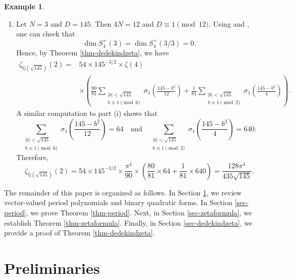 \documentclass[12pt]{amsart}
\numberwithin{equation}{section}
\theoremstyle{definition}
\newtheorem{example}{Example}[section]
\begin{document}
\begin{example}
\begin{enumerate}
        \item[(ii)] Let $N=3$ and $D=145$. Then $4N=12$ and $D\equiv 1\pmod{12}$. Using \cite[Lemma 2.2]{CK13} and \cite[Corollary 8.8]{K92}, one can check that
        $$\dim S_{4}^{+}(3)=\dim S_{4}^{+}(3/3)=0.$$
        Hence, by Theorem \ref{thm-dedekindzeta}, we have
        \begin{align*}
            \zeta_{\mathbb{Q}(\sqrt{145})}(2)=&54\times 145^{-3/2}\times\zeta(4)\\
            &\times\left(\frac{80}{81}\sum\limits_{\substack{|b|<\sqrt{145}\\ b\equiv 1\pmod{6}}}\sigma_{1}\left(\frac{145-b^{2}}{12}\right)+\frac{1}{81}\sum\limits_{\substack{|b|<\sqrt{145}\\ b\equiv 1\pmod{2}}}\sigma_{1}\left(\frac{145-b^{2}}{4}\right)\right).
        \end{align*}
        A similar computation to part (i) shows that
        \begin{equation*}
            \sum\limits_{\substack{|b|<\sqrt{145}\\ b\equiv 1\pmod{6}}}
            \sigma_{1}\left(\frac{145-b^{2}}{12}\right)=64\quad\text{and}\quad\sum\limits_{\substack{|b|<\sqrt{145}\\ b\equiv 1\pmod{2}}}\sigma_{1}\left(\frac{145-b^{2}}{4}\right)=640.
        \end{equation*}
        Therefore,
        $$\zeta_{\mathbb{Q}(\sqrt{145})}(2)=54\times 145^{-3/2}\times\frac{\pi^{4}}{90}\times\left(\frac{80}{81}\times 64+\frac{1}{81}\times 640\right)=\frac{128\pi^{4}}{435\sqrt{145}}.$$ 
    \end{enumerate}
\end{example}

The remainder of this paper is organized as follows. In Section \ref{sec-prel}, we review vector-valued period polynomials and binary quadratic forms. 
In Section \ref{sec-period}, we prove Theorem \ref{thm-period}. Next, in Section \ref{sec-zetaformula}, we establish Theorem \ref{thm-zetaformula}. Finally, in Section \ref{sec-dedekindzeta}, we provide a proof of Theorem \ref{thm-dedekindzeta}.

\section{Preliminaries}\label{sec-prel}
\end{document}
